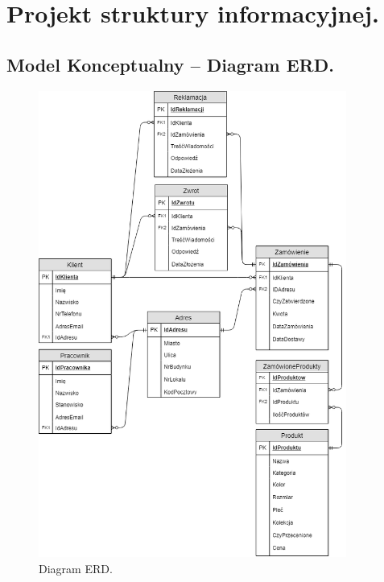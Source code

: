 \documentclass[a4paper,11pt]{article}
\begin{document}
\section {Projekt struktury informacyjnej.}
\subsection {Model Konceptualny – Diagram ERD.}

\begin{figure}[H]
	\centering
		\includegraphics[width=0.9\textwidth]{Diagramy/DFD0-Baza-Danych.png}
	\caption{Diagram ERD.}
\end{figure}
\end{document}
